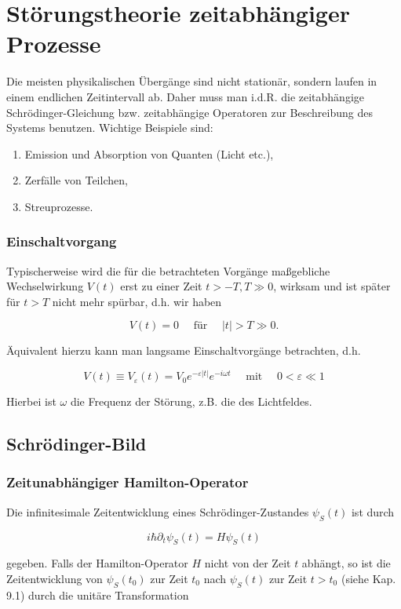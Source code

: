 \documentclass[10pt, letterpaper]{article}
\begin{document}
\pagebreak

\section{Störungstheorie zeitabhängiger Prozesse}


Die meisten physikalischen Übergänge sind nicht stationär, sondern laufen in einem endlichen Zeitintervall ab. Daher muss man i.d.R. die zeitabhängige Schrödinger-Gleichung bzw. zeitabhängige Operatoren zur Beschreibung des Systems benutzen. Wichtige Beispiele sind:

\begin{enumerate}
  \item Emission und Absorption von Quanten (Licht etc.),
  \item Zerfälle von Teilchen,
  \item Streuprozesse.
\end{enumerate}

\subsubsection*{Einschaltvorgang}
Typischerweise wird die für die betrachteten Vorgänge maßgebliche Wechselwirkung $V(t)$ erst zu einer Zeit $t>-T, T \gg 0$, wirksam und ist später für $t>T$ nicht mehr spürbar, d.h. wir haben

$$
V(t)=0 \quad \text { für } \quad|t|>T \gg 0 .
$$

Äquivalent hierzu kann man langsame Einschaltvorgänge betrachten, d.h.

$$
V(t) \equiv V_{\varepsilon}(t)=V_{0} e^{-\varepsilon|t|} e^{-i \omega t} \quad \text { mit } \quad 0<\varepsilon \ll 1
$$

Hierbei ist $\omega$ die Frequenz der Störung, z.B. die des Lichtfeldes.

\subsection*{Schrödinger-Bild}
\subsubsection*{Zeitunabhängiger Hamilton-Operator}
Die infinitesimale Zeitentwicklung eines Schrödinger-Zustandes $\psi_{S}(t)$ ist durch

$$
i \hbar \partial_{t} \psi_{S}(t)=H \psi_{S}(t)
$$

gegeben. Falls der Hamilton-Operator $H$ nicht von der Zeit $t$ abhängt, so ist die Zeitentwicklung von $\psi_{S}\left(t_{0}\right)$ zur Zeit $t_{0}$ nach $\psi_{S}(t)$ zur Zeit $t>t_{0}$ (siehe Kap. 9.1) durch die unitäre Transformation
\end{document}
